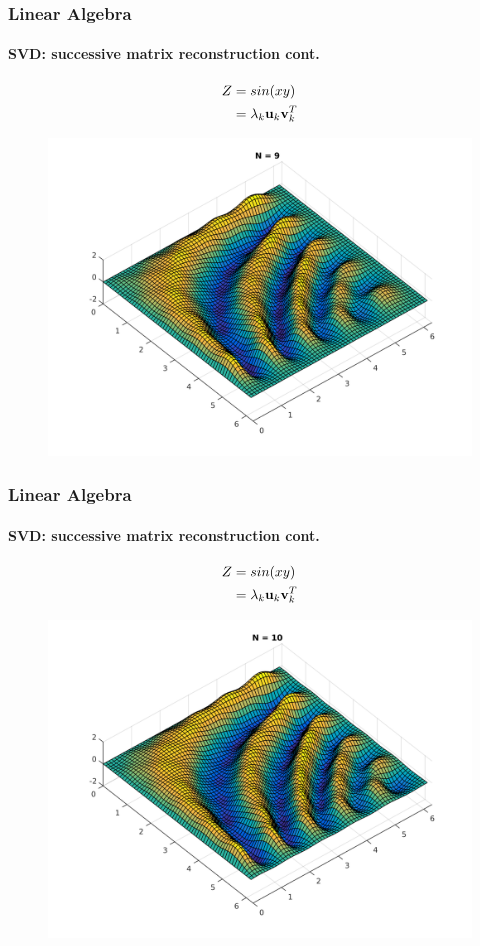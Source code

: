 \documentclass[hyperref={pdfpagelabels=true}]{beamer}
\begin{document}
\begin{frame}
\frametitle{Linear Algebra}
\framesubtitle{SVD: successive matrix reconstruction {\tiny cont.}} 
\small{
\begin{center}
\begin{align*}
Z &= sin(xy) \\
  &= \lambda_k{\bf u}_k {\bf v}_k^T
\end{align*}
\end{center}}
\begin{figure}[!htb]
\centering
\includegraphics [scale=0.415]{as/a9.png}
\end{figure}
\end{frame}

\begin{frame}
\frametitle{Linear Algebra}
\framesubtitle{SVD: successive matrix reconstruction {\tiny cont.}} 
\small{
\begin{center}
\begin{align*}
Z &= sin(xy) \\
  &= \lambda_k{\bf u}_k {\bf v}_k^T
\end{align*}
\end{center}}
\begin{figure}[!htb]
\centering
\includegraphics [scale=0.415]{as/a10.png}
\end{figure}
\end{frame}
\end{document}
